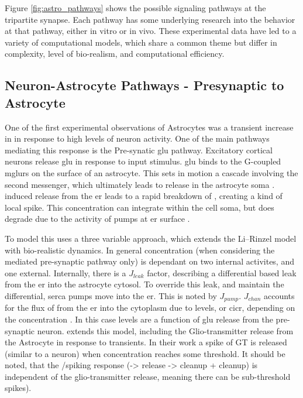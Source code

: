     Figure \ref{fig:astro_pathways} shows the possible signaling pathways at the
    tripartite synapse. Each pathway has some underlying research into the
    behavior at that pathway, either in vitro or in vivo. These experimental data
    have led to a variety of computational models, which share a common theme but
    differ in complexity, level of bio-realism, and computational efficiency.

    \subsection{Neuron-Astrocyte Pathways - Presynaptic to Astrocyte}

    One of the first experimental observations of Astrocytes was a transient
    increase in \ca in response to high levels of neuron activity. One of the
    main pathways mediating this response is the Pre-synatic \Gls{glu}
    pathway. Excitatory cortical neurons release \Gls{glu} in response to input
    stimulus. \Gls{glu} binds to the G-coupled \Glspl{mglur} on the surface
    of an astrocyte. This sets in motion a cascade involving the \ipt second
    messenger, which ultimately leads to \ca release in the astrocyte soma
    \parencite{pitta_2012}. \ipt induced \ca release from the \Gls{er} leads to a rapid
    breakdown of \ipt, creating a kind of local \ca spike. This \ca
    concentration can integrate within the cell soma, but does degrade due to
    the activity of pumps at \Gls{er} surface \parencite{pitta_2012}.

    To model this \parencite{pitta_2009} uses a three variable approach, which
    extends the Li–Rinzel model with bio-realistic \ipt dynamics. In general \ca
    concentration (when considering the \ipt mediated pre-synaptic pathway only)
    is dependant on two internal activites, and one external. Internally, there
    is a $J_{leak}$ factor, describing a differential based leak from the \Gls{er}
    into the astrocyte cytosol. To override this leak, and maintain the
    differential, \gls{serca} pumps move \ca into the \Gls{er}. This is noted by
    $J_{pump}$. $J_{chan}$ accounts for the flux of \ca from the \Gls{er} into the
    cytoplasm due to \ipt levels, or \Gls{cicr}, depending on the \ca concentration
    \parencite{pitta_2009}. In this case \ipt levels are a function of \Gls{glu}
    release from the pre-synaptic neuron. \parencite{pitta_2016} extends this model,
    including the Glio-transmitter release from the Astrocyte in response to
    \ca transients. In their work a spike of GT is released (similar to a
    neuron) when \ca concentration reaches some threshold. It should be noted,
    that the \ipt/\ca spiking response (\ipt -> \ca release -> \ipt cleanup + \ca
    cleanup) is independent of the glio-transmitter release, meaning there can be
    sub-threshold \ca spikes).

